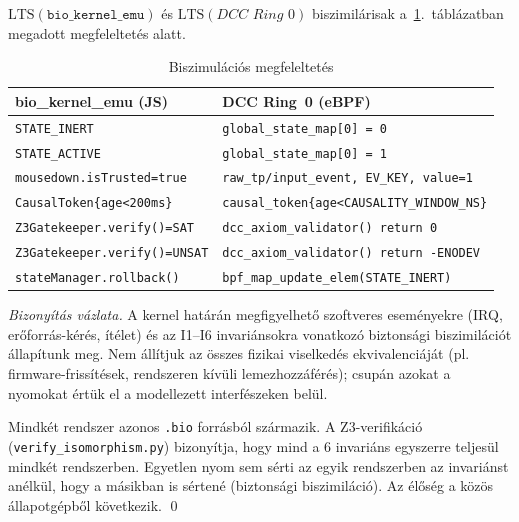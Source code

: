 \documentclass[11pt,a4paper,twoside]{article}
\begin{document}
\begin{tetel}\label{thm:biszim_hu}
$\mathrm{LTS}(\texttt{bio\_kernel\_emu})$ és $\mathrm{LTS}(\textit{DCC Ring~0})$
biszimilárisak a~\ref{tab:bisim_hu}.~táblázatban megadott megfeleltetés alatt.
\end{tetel}

\begin{table}[H]
\centering
\caption{Biszimulációs megfeleltetés\label{tab:bisim_hu}}
\begin{tabular}{@{}ll@{}}
\toprule
\textbf{bio\_kernel\_emu (JS)} & \textbf{DCC Ring~0 (eBPF)} \\ \midrule
\texttt{STATE\_INERT}               & \texttt{global\_state\_map[0] = 0} \\
\texttt{STATE\_ACTIVE}              & \texttt{global\_state\_map[0] = 1} \\
\texttt{mousedown.isTrusted=true}   & \texttt{raw\_tp/input\_event, EV\_KEY, value=1} \\
\texttt{CausalToken\{age<200ms\}}   & \texttt{causal\_token\{age<CAUSALITY\_WINDOW\_NS\}} \\
\texttt{Z3Gatekeeper.verify()=SAT}  & \texttt{dcc\_axiom\_validator() return 0} \\
\texttt{Z3Gatekeeper.verify()=UNSAT}& \texttt{dcc\_axiom\_validator() return -ENODEV} \\
\texttt{stateManager.rollback()}    & \texttt{bpf\_map\_update\_elem(STATE\_INERT)} \\
\bottomrule
\end{tabular}
\end{table}

\begin{proof}[Bizonyítás vázlata]
A kernel határán megfigyelhető szoftveres eseményekre (IRQ, erőforrás-kérés,
ítélet) és az I1--I6 invariánsokra vonatkozó biztonsági biszimilációt
állapítunk meg. Nem állítjuk az összes fizikai viselkedés ekvivalenciáját
(pl. firmware-frissítések, rendszeren kívüli lemezhozzáférés); csupán azokat
a nyomokat értük el a modellezett interfészeken belül.

Mindkét rendszer azonos \texttt{.bio} forrásból származik. A Z3-verifikáció
(\texttt{verify\_isomorphism.py}) bizonyítja, hogy mind a 6 invariáns
egyszerre teljesül mindkét rendszerben. Egyetlen nyom sem sérti az egyik
rendszerben az invariánst anélkül, hogy a másikban is sértené
(biztonsági biszimiláció). Az élőség a közös állapotgépből következik. \qed
\end{proof}
\end{document}
